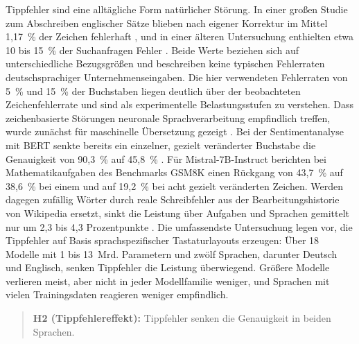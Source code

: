 \documentclass[a4paper,titlepage]{article}
\numberwithin{equation}{section} %
\begin{document}
Tippfehler sind eine alltägliche Form natürlicher Störung. In einer großen Studie zum Abschreiben englischer Sätze blieben nach eigener Korrektur im Mittel 1,17~\% der Zeichen fehlerhaft \citep{dhakal_observations_2018}, und in einer älteren Untersuchung enthielten etwa 10 bis 15~\% der Suchanfragen Fehler \citep{cucerzan_spelling_2004}. Beide Werte beziehen sich auf unterschiedliche Bezugsgrößen und beschreiben keine typischen Fehlerraten deutschsprachiger Unternehmenseingaben. Die hier verwendeten Fehlerraten von 5~\% und 15~\% der Buchstaben liegen deutlich über der beobachteten Zeichenfehlerrate und sind als experimentelle Belastungsstufen zu verstehen. Dass zeichenbasierte Störungen neuronale Sprachverarbeitung empfindlich treffen, wurde zunächst für maschinelle Übersetzung gezeigt \citep{belinkov_synthetic_2018}. Bei der Sentimentanalyse mit BERT senkte bereits ein einzelner, gezielt veränderter Buchstabe die Genauigkeit von 90,3~\% auf 45,8~\% \citep{pruthi_combating_2019}. Für Mistral-7B-Instruct berichten \citet{gan_reasoning_2024} bei Mathematikaufgaben des Benchmarks GSM8K einen Rückgang von 43,7~\% auf 38,6~\% bei einem und auf 19,2~\% bei acht gezielt veränderten Zeichen. Werden dagegen zufällig Wörter durch reale Schreibfehler aus der Bearbeitungshistorie von Wikipedia ersetzt, sinkt die Leistung über Aufgaben und Sprachen gemittelt nur um 2,3 bis 4,3 Prozentpunkte \citep{aliakbarzadeh_exploring_2025}. Die umfassendste Untersuchung legen \citet{zhao_evaluating_2026} vor, die Tippfehler auf Basis sprachspezifischer Tastaturlayouts erzeugen: Über 18 Modelle mit 1 bis 13~Mrd. Parametern und zwölf Sprachen, darunter Deutsch und Englisch, senken Tippfehler die Leistung überwiegend. Größere Modelle verlieren meist, aber nicht in jeder Modellfamilie weniger, und Sprachen mit vielen Trainingsdaten reagieren weniger empfindlich.

\begin{quote}
\textbf{H2 (Tippfehlereffekt):} Tippfehler senken die Genauigkeit in beiden Sprachen.
\end{quote}
\end{document}

